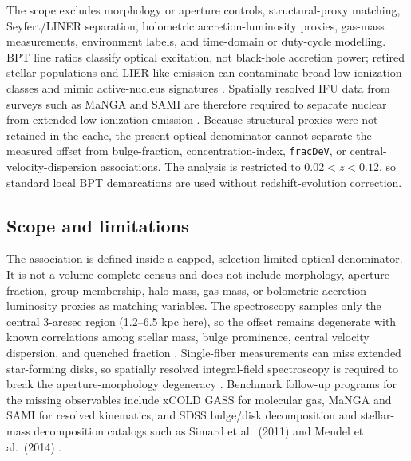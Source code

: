 \documentclass[twocolumn]{aastex631}
\begin{document}
The scope excludes morphology or aperture controls, structural-proxy matching, Seyfert/LINER separation, bolometric accretion-luminosity proxies, gas-mass measurements, environment labels, and time-domain or duty-cycle modelling. BPT line ratios classify optical excitation, not black-hole accretion power; retired stellar populations and LIER-like emission can contaminate broad low-ionization classes and mimic active-nucleus signatures \citep{cidfernandes2011,singh2013,stasinska2008,stasinska2015,belfiore2016}. Spatially resolved IFU data from surveys such as MaNGA and SAMI are therefore required to separate nuclear from extended low-ionization emission \citep{bundy2015,croom2012,belfiore2016}. Because structural proxies were not retained in the cache, the present optical denominator cannot separate the measured offset from bulge-fraction, concentration-index, \texttt{fracDeV}, or central-velocity-dispersion associations. The analysis is restricted to $0.02<z<0.12$, so standard local BPT demarcations are used without redshift-evolution correction.

\subsection{Scope and limitations}
The association is defined inside a capped, selection-limited optical denominator. It is not a volume-complete census and does not include morphology, aperture fraction, group membership, halo mass, gas mass, or bolometric accretion-luminosity proxies as matching variables. The spectroscopy samples only the central 3-arcsec region (1.2--6.5 kpc here), so the offset remains degenerate with known correlations among stellar mass, bulge prominence, central velocity dispersion, and quenched fraction \citep{schawinski2010,bluck2014,piotrowska2022}. Single-fiber measurements can miss extended star-forming disks, so spatially resolved integral-field spectroscopy is required to break the aperture-morphology degeneracy \citep{penny2018,cheung2016,bundy2015,canodiaz2016}. Benchmark follow-up programs for the missing observables include xCOLD GASS for molecular gas, MaNGA and SAMI for resolved kinematics, and SDSS bulge/disk decomposition and stellar-mass decomposition catalogs such as Simard et al.\ (2011) and Mendel et al.\ (2014) \citep{xcoldgass2017,bundy2015,croom2012,simard2011,mendel2014}.
\end{document}
